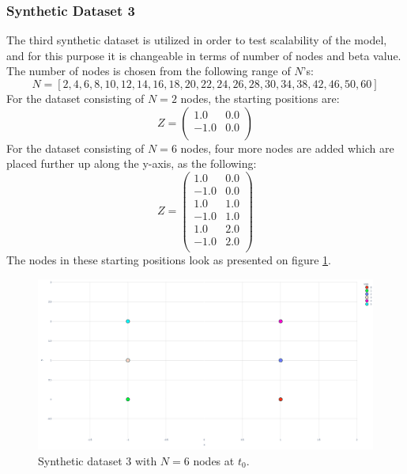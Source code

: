 \subsubsection{Synthetic Dataset 3}
\label{sec:Data:SyntheticData:SyntheticDataset3}
The third synthetic dataset is utilized in order to test scalability of the model, and for this purpose it is changeable in terms of number of nodes and beta value.
The number of nodes is chosen from the following range of $N$'s:
\begin{equation}
    N = [2, 4, 6, 8, 10, 12, 14, 16, 18, 20, 22, 24, 26, 28, 30, 34, 38, 42, 46, 50, 60]
\end{equation}
For the dataset consisting of $N = 2$ nodes, the starting positions are:
\begin{equation}
        Z = \left( \begin{matrix}
                1.0 & 0.0\\
                -1.0 & 0.0\\
                \end{matrix}\right)
\end{equation}
For the dataset consisting of $N = 6$ nodes, four more nodes are added which are placed further up along the y-axis, as the following:
\begin{equation}
        Z = \left( \begin{matrix}
                1.0 & 0.0\\
                -1.0 & 0.0\\
                1.0 & 1.0\\
                -1.0 & 1.0\\
                1.0 & 2.0\\
                -1.0 & 2.0\\
                \end{matrix}\right)
\end{equation}
The nodes in these starting positions look as presented on figure \ref{fig:synth3}.
\begin{figure}[H]
    \centering
    \includegraphics[width=\textwidth]{0_images/synth3_n6.png}
    \caption{Synthetic dataset 3 with $N=6$ nodes at $t_0$.}
    \label{fig:synth3}
\end{figure}

